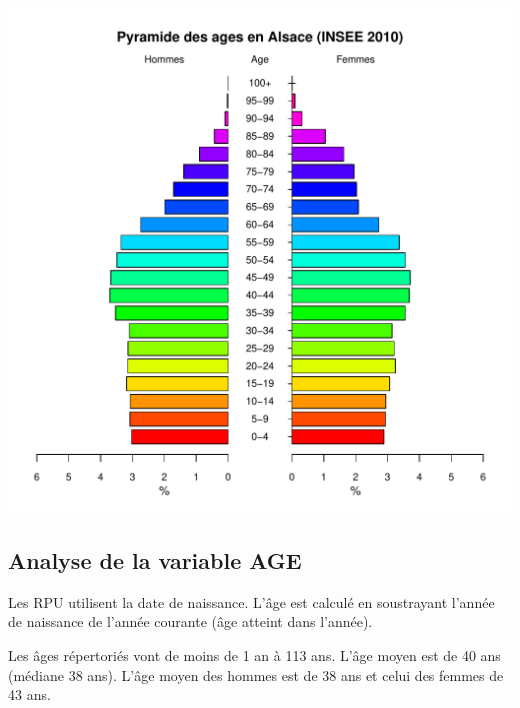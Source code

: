 \documentclass[12pt,english,french,twoside]{book}\usepackage[]{graphicx}\usepackage[]{color}
\makeatletter
\def\maxwidth{ %
  \ifdim\Gin@nat@width>\linewidth
    \linewidth
  \else
    \Gin@nat@width
  \fi
}
\newenvironment{knitrout}{}{} %
\makeatother
\begin{document}
\begin{center}
\begin{knitrout}
\color{fgcolor}
\includegraphics[width=\maxwidth]{figure/pyramide_graphe2-1} 

\end{knitrout}
\label{fig:pyr_age_inseep100}
\end{center}




\subsection*{Analyse de la variable AGE}

Les RPU utilisent la date de naissance. L'âge est calculé en soustrayant l’année de naissance de l'année courante (âge atteint dans l'année).





Les âges répertoriés vont de moins de 1 an à 113 ans. L'âge moyen est de 40 ans (médiane 38 ans). L'âge moyen des hommes est de 38 ans et celui des femmes de 43 ans.
\end{document}
